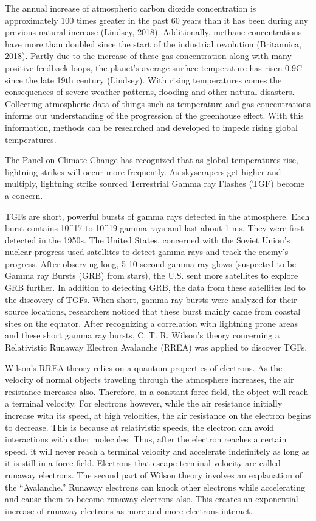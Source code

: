 \documentclass[12pt,]{article}
\begin{document}
The annual increase of atmospheric carbon dioxide concentration is
approximately 100 times greater in the past 60 years than it has been
during any previous natural increase (Lindsey, 2018). Additionally,
methane concentrations have more than doubled since the start of the
industrial revolution (Britannica, 2018). Partly due to the increase of
these gas concentration along with many positive feedback loops, the
planet's average surface temperature has risen 0.9\degree C since the
late 19th century (Lindsey). With rising temperatures comes the
consequences of severe weather patterns, flooding and other natural
disasters. Collecting atmospheric data of things such as temperature and
gas concentrations informs our understanding of the progression of the
greenhouse effect. With this information, methods can be researched and
developed to impede rising global temperatures.

The Panel on Climate Change has recognized that as global temperatures
rise, lightning strikes will occur more frequently. As skyscrapers get
higher and multiply, lightning strike sourced Terrestrial Gamma ray
Flashes (TGF) become a concern.

TGFs are short, powerful bursts of gamma rays detected in the
atmosphere. Each burst contains 10\^{}17 to 10\^{}19 gamma rays and last
about 1 ms. They were first detected in the 1950s. The United States,
concerned with the Soviet Union's nuclear progress used satellites to
detect gamma rays and track the enemy's progress. After observing long,
5-10 second gamma ray glows (suspected to be Gamma ray Bursts (GRB) from
stars), the U.S. sent more satellites to explore GRB further. In
addition to detecting GRB, the data from these satellites led to the
discovery of TGFs. When short, gamma ray bursts were analyzed for their
source locations, researchers noticed that these burst mainly came from
coastal sites on the equator. After recognizing a correlation with
lightning prone areas and these short gamma ray bursts, C. T. R.
Wilson's theory concerning a Relativistic Runaway Electron Avalanche
(RREA) was applied to discover TGFs.

Wilson's RREA theory relies on a quantum properties of electrons. As the
velocity of normal objects traveling through the atmosphere increases,
the air resistance increases also. Therefore, in a constant force field,
the object will reach a terminal velocity. For electrons however, while
the air resistance initially increase with its speed, at high
velocities, the air resistance on the electron begins to decrease. This
is because at relativistic speeds, the electron can avoid interactions
with other molecules. Thus, after the electron reaches a certain speed,
it will never reach a terminal velocity and accelerate indefinitely as
long as it is still in a force field. Electrons that escape terminal
velocity are called runaway electrons. The second part of Wilson theory
involves an explanation of the ``Avalanche.'' Runaway electrons can
knock other electrons while accelerating and cause them to become
runaway electrons also. This creates an exponential increase of runaway
electrons as more and more electrons interact.
\end{document}
